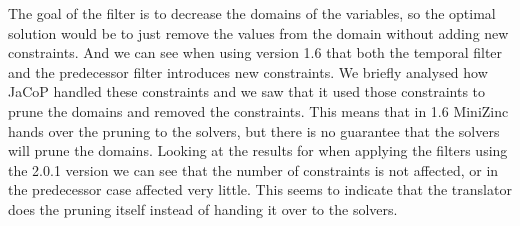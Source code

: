 The goal of the filter is to decrease the domains of the variables, so the optimal solution would be to just remove the values from the domain without adding new constraints. And we can see when using version 1.6 that both the temporal filter and the predecessor filter introduces new constraints. We briefly analysed how JaCoP handled these constraints and we saw that it used those constraints to prune the domains and removed the constraints. This means that in 1.6 MiniZinc hands over the pruning to the solvers, but there is no guarantee that the solvers will prune the domains. Looking at the results for when applying the filters using the 2.0.1 version we can see that the number of constraints is not affected, or in the predecessor case affected very little. This seems to indicate that the translator does the pruning itself instead of handing it over to the solvers.



